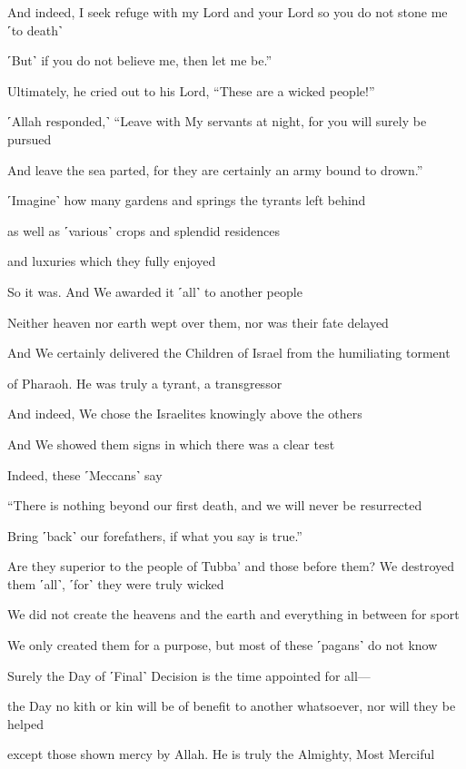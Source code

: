 And indeed, I seek refuge with my Lord and your Lord so you do not stone me ˹to death˺

˹But˺ if you do not believe me, then let me be.”

Ultimately, he cried out to his Lord, “These are a wicked people!”

˹Allah responded,˺ “Leave with My servants at night, for you will surely be pursued

And leave the sea parted, for they are certainly an army bound to drown.”

˹Imagine˺ how many gardens and springs the tyrants left behind

as well as ˹various˺ crops and splendid residences

and luxuries which they fully enjoyed

So it was. And We awarded it ˹all˺ to another people

Neither heaven nor earth wept over them, nor was their fate delayed

And We certainly delivered the Children of Israel from the humiliating torment

of Pharaoh. He was truly a tyrant, a transgressor

And indeed, We chose the Israelites knowingly above the others

And We showed them signs in which there was a clear test

Indeed, these ˹Meccans˺ say

“There is nothing beyond our first death, and we will never be resurrected

Bring ˹back˺ our forefathers, if what you say is true.”

Are they superior to the people of Tubba’ and those before them? We destroyed them ˹all˺, ˹for˺ they were truly wicked

We did not create the heavens and the earth and everything in between for sport

We only created them for a purpose, but most of these ˹pagans˺ do not know

Surely the Day of ˹Final˺ Decision is the time appointed for all—

the Day no kith or kin will be of benefit to another whatsoever, nor will they be helped

except those shown mercy by Allah. He is truly the Almighty, Most Merciful

